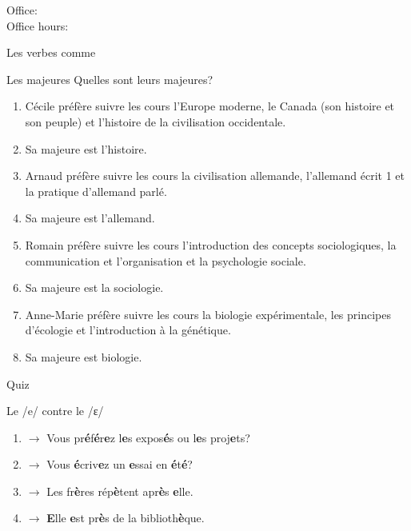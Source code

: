 \documentclass{beamer}
\subtitle[Études et verbes \lexi{préférer}]{Vos études et les verbes comme \lexi{préférer}}
\begin{document}
  \begin{frame}
    \titlepage
    \tiny{Office: \\
          Office hours: }
  \end{frame}

  \begin{frame}{Les verbes comme }
    \begin{center}
      
    \end{center}
  \end{frame}

  \begin{frame}{Les majeures}
    Quelles sont leurs majeures?
    \begin{enumerate}
      \item Cécile préfère suivre les cours l'Europe moderne, le Canada (son histoire et son peuple) et l'histoire de la civilisation occidentale.
      \item[$\to$]<2-> Sa majeure est l'histoire.
      \item<3-> Arnaud préfère suivre les cours la civilisation allemande, l'allemand écrit 1 et la pratique d'allemand parlé.
      \item[$\to$]<4-> Sa majeure est l'allemand.
      \item<5-> Romain préfère suivre les cours l'introduction des concepts sociologiques, la communication et l'organisation et la psychologie sociale.
      \item[$\to$]<6-> Sa majeure est la sociologie.
      \item<7-> Anne-Marie préfère suivre les cours la biologie expérimentale, les principes d'écologie et l'introduction à la génétique.
      \item[$\to$]<8-> Sa majeure est biologie.
    \end{enumerate}
  \end{frame}

  \begin{frame}{}
    \begin{center}
      \Large Quiz
    \end{center}
  \end{frame}

  \begin{frame}{Le /e/ contre le /ɛ/}
    \begin{enumerate}
      \item[/e/] $\to$ Vous pr\textbf{é}f\textbf{é}r\textbf{e}z l\textbf{e}s expos\textbf{é}s ou l\textbf{e}s proj\textbf{e}ts?
      \item[/e/] $\to$ Vous \textbf{é}criv\textbf{e}z un \textbf{e}ssai en \textbf{é}t\textbf{é}?
      \item[/ɛ/] $\to$ Les fr\textbf{è}res rép\textbf{è}tent apr\textbf{è}s \textbf{e}lle.
      \item[/ɛ/] $\to$ \textbf{E}lle \textbf{e}st pr\textbf{è}s de la biblioth\textbf{è}que.
    \end{enumerate}
  \end{frame}
\end{document}
